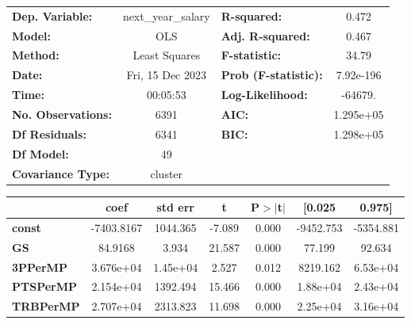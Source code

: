 \begin{center}
\begin{tabular}{lclc}
\toprule
\textbf{Dep. Variable:}       & next\_year\_salary & \textbf{  R-squared:         } &     0.472   \\
\textbf{Model:}               &        OLS         & \textbf{  Adj. R-squared:    } &     0.467   \\
\textbf{Method:}              &   Least Squares    & \textbf{  F-statistic:       } &     34.79   \\
\textbf{Date:}                &  Fri, 15 Dec 2023  & \textbf{  Prob (F-statistic):} & 7.92e-196   \\
\textbf{Time:}                &      00:05:53      & \textbf{  Log-Likelihood:    } &   -64679.   \\
\textbf{No. Observations:}    &         6391       & \textbf{  AIC:               } & 1.295e+05   \\
\textbf{Df Residuals:}        &         6341       & \textbf{  BIC:               } & 1.298e+05   \\
\textbf{Df Model:}            &           49       & \textbf{                     } &             \\
\textbf{Covariance Type:}     &      cluster       & \textbf{                     } &             \\
\bottomrule
\end{tabular}
\begin{tabular}{lcccccc}
                              & \textbf{coef} & \textbf{std err} & \textbf{t} & \textbf{P$> |$t$|$} & \textbf{[0.025} & \textbf{0.975]}  \\
\midrule
\textbf{const}                &   -7403.8167  &     1044.365     &    -7.089  &         0.000        &    -9452.753    &    -5354.881     \\
\textbf{GS}                   &      84.9168  &        3.934     &    21.587  &         0.000        &       77.199    &       92.634     \\
\textbf{3PPerMP}              &    3.676e+04  &     1.45e+04     &     2.527  &         0.012        &     8219.162    &     6.53e+04     \\
\textbf{PTSPerMP}             &    2.154e+04  &     1392.494     &    15.466  &         0.000        &     1.88e+04    &     2.43e+04     \\
\textbf{TRBPerMP}             &    2.707e+04  &     2313.823     &    11.698  &         0.000        &     2.25e+04    &     3.16e+04     \\

\end{tabular}
\end{center}
